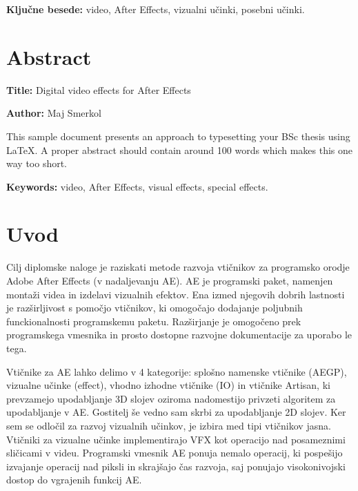 \documentclass[a4paper, 12pt]{book}
\newcommand{\ttitleEn}{Digital video effects for After Effects}
\newcommand{\tauthor}{Maj Smerkol}
\newcommand{\tkeywords}{video, After Effects, vizualni učinki, posebni učinki}
\newcommand{\tkeywordsEn}{video, After Effects, visual effects, special effects}
\newcommand{\clearemptydoublepage}{\newpage{\pagestyle{empty}\cleardoublepage}}
\begin{document}
\bigskip

\noindent\textbf{Ključne besede:} \tkeywords.
\clearemptydoublepage

\chapter*{Abstract}

\noindent\textbf{Title:} \ttitleEn
\bigskip

\noindent\textbf{Author:} \tauthor
\bigskip

\noindent This sample document presents an approach to typesetting your BSc thesis using \LaTeX. 
A proper abstract should contain around 100 words which makes this one way too short.
\bigskip

\noindent\textbf{Keywords:} \tkeywordsEn.
\clearemptydoublepage

\mainmatter
\setcounter{page}{1}
\pagestyle{fancy}

\chapter{Uvod}

Cilj diplomske naloge je raziskati metode razvoja vtičnikov za programsko orodje Adobe After Effects (v nadaljevanju AE). 
AE je programski paket, namenjen montaži videa in izdelavi vizualnih efektov. 
Ena izmed njegovih dobrih lastnosti je razširljivost s pomočjo vtičnikov, ki omogočajo dodajanje poljubnih funckionalnosti programskemu paketu. 
Razširjanje je omogočeno prek programskega vmesnika in prosto dostopne razvojne dokumentacije za uporabo le tega. 

Vtičnike za AE lahko delimo v 4 kategorije: 
splošno namenske vtičnike (AEGP), 
vizualne učinke (effect), 
vhodno izhodne vtičnike (IO) in 
vtičnike Artisan, ki prevzamejo upodabljanje 3D slojev oziroma nadomestijo privzeti algoritem za upodabljanje v AE. 
Gostitelj še vedno sam skrbi za upodabljanje 2D slojev. 
Ker sem se odločil za razvoj vizualnih učinkov, je izbira med tipi vtičnikov jasna. 
Vtičniki za vizualne učinke implementirajo VFX kot operacijo nad posameznimi sličicami v videu. 
Programski vmesnik AE ponuja nemalo operacij, ki pospešijo izvajanje operacij nad piksli in skrajšajo čas razvoja, saj ponujajo visokonivojski dostop do vgrajenih funkcij AE. 
\end{document}

